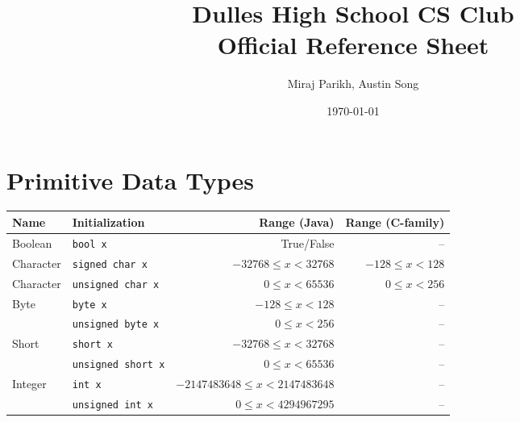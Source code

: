 \documentclass[11pt]{article}
\title{Dulles High School CS Club\\Official Reference Sheet}
\date{\today}
\author{Miraj Parikh, Austin Song}
\begin{document}

{\let\newpage\relax\maketitle} %

\renewcommand{\arraystretch}{1.25}
\section{Primitive Data Types}
\begin{center}\begin{tabular}{llrr}\toprule
  Name            & Initialization              & Range (Java) & Range (C-family) \\\midrule
  Boolean         & \lstinline|bool x|          & True/False & --\\\midrule
  Character & \lstinline|signed char x|   & \(-32768 \leq x < 32768\) & \(-128 \leq x < 128\) \\ 
  Character & \lstinline|unsigned char x|          & \(0 \leq x < 65536\) & \(0 \leq x < 256\) \\
  Byte            & \lstinline|byte x|          & \(-128 \leq x < 128\) & -- \\
                  & \lstinline|unsigned byte x| & \(0 \leq x < 256\) & -- \\
  Short           & \lstinline|short x|         & \(-32768 \leq x < 32768\) & -- \\
                  & \lstinline|unsigned short x|& \(0 \leq x < 65536\) & -- \\
  Integer         & \lstinline|int x|           & \(-2147483648 \leq x < 2147483648\) & -- \\
                  & \lstinline|unsigned int x|  & \(0 \leq x < 4294967295\) & -- \\
\end{tabular}\end{center}

\setlength{\tabcolsep}{1pt}
\renewcommand{\arraystretch}{1}
\end{document}
